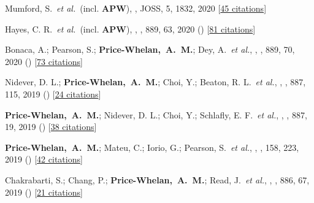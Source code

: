 \item[{\color{deemph}\scriptsize71}]Mumford, S.~\textit{et al.}~(incl. \textbf{APW}), , JOSS, 5, 1832, 2020 [\href{http://adsabs.harvard.edu/abs/2020JOSS....5.1832M}{45 citations}]

\item[{\color{deemph}\scriptsize70}]Hayes, C. R.~\textit{et al.}~(incl. \textbf{APW}), , \apj, 889, 63, 2020 () [\href{http://adsabs.harvard.edu/abs/2020ApJ...889...63H}{81 citations}]

\item[{\color{deemph}\scriptsize69}]Bonaca, A.; Pearson, S.; \textbf{Price-Whelan,~A.~M.}; Dey, A.~\textit{et al.}, , \apj, 889, 70, 2020 () [\href{http://adsabs.harvard.edu/abs/2020ApJ...889...70B}{73 citations}]

\item[{\color{deemph}\scriptsize68}]Nidever, D. L.; \textbf{Price-Whelan,~A.~M.}; Choi, Y.; Beaton, R. L.~\textit{et al.}, , \apj, 887, 115, 2019 () [\href{http://adsabs.harvard.edu/abs/2019ApJ...887..115N}{24 citations}]

\item[{\color{deemph}\scriptsize67}]\textbf{Price-Whelan,~A.~M.}; Nidever, D. L.; Choi, Y.; Schlafly, E. F.~\textit{et al.}, , \apj, 887, 19, 2019 () [\href{http://adsabs.harvard.edu/abs/2019ApJ...887...19P}{38 citations}]

\item[{\color{deemph}\scriptsize66}]\textbf{Price-Whelan,~A.~M.}; Mateu, C.; Iorio, G.; Pearson, S.~\textit{et al.}, , \aj, 158, 223, 2019 () [\href{http://adsabs.harvard.edu/abs/2019AJ....158..223P}{42 citations}]

\item[{\color{deemph}\scriptsize65}]Chakrabarti, S.; Chang, P.; \textbf{Price-Whelan,~A.~M.}; Read, J.~\textit{et al.}, , \apj, 886, 67, 2019 () [\href{http://adsabs.harvard.edu/abs/2019ApJ...886...67C}{21 citations}]

